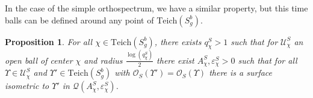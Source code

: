 \documentclass[a4paper,12pt]{article}
\newtheorem{proposition}[theorem]{Proposition}
\theoremstyle{definition}
\theoremstyle{remark}
\begin{document}
In the case of the simple orthospectrum, we have a similar property, but this time balls can be defined around any point of $\mathrm{Teich}(S_g^b)$.

\begin{proposition}\label{prop:UxS}
    For all $\chi \in \mathrm{Teich}(S_g^b)$, there exists $q_\chi^S >1$ such that for $\mathcal{U}_\chi^S$ an open ball of center $\chi$ and radius $\frac{\log(q_\chi^S)}{2}$ there exist $A_\chi^S, \varepsilon_\chi^S >0$ such that for all $\Upsilon \in \mathcal{U}_\chi^S$ and $\Upsilon' \in \mathrm{Teich}(S_g^b)$ with $\mathcal{O}_S(\Upsilon')=\mathcal{O}_S(\Upsilon)$ there is a surface isometric to $\Upsilon'$ in $\mathcal{Q}(A_\chi^S,\varepsilon_\chi^S)$.
\end{proposition}
\end{document}
